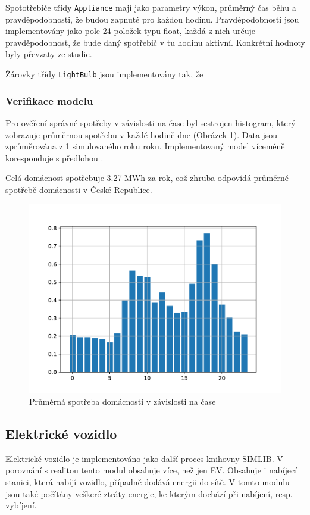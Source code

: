 \documentclass[12pt,a4paper]{article}
\begin{document}
Spototřebiče třídy \texttt{Appliance} mají jako parametry výkon, průměrný čas běhu a pravděpodobnosti, že budou zapnuté pro každou hodinu.
Pravděpodobnosti jsou implementovány jako pole 24 položek typu float,
každá z nich určuje pravděpodobnost, že bude daný spotřebič v tu hodinu aktivní.
Konkrétní hodnoty byly převzaty ze studie. \cite{TORRITI201737}

Žárovky třídy \texttt{LightBulb} jsou implementovány tak,
že

\subsubsection{Verifikace modelu}

Pro ověření správné spotřeby v závislosti na čase byl sestrojen histogram,
který zobrazuje průměrnou spotřebu v každé hodině dne (Obrázek \ref{fig:average_day_load}).
Data jsou zprůměrována z 1 simulovaného roku roku.
Implementovaný model víceméně koresponduje s předlohou \cite{TORRITI201737}.

Celá domácnost spotřebuje 3.27 MWh za rok, což zhruba odpovídá průměrné spotřebě domácnosti v České Republice\cite{CEZ}.



\begin{figure}
\includegraphics[width=\linewidth]{img/average_day_load.pdf}
\caption{Průměrná spotřeba domácnosti v závislosti na čase}
\label{fig:average_day_load}
\end{figure}

\subsection{Elektrické vozidlo}
Elektrické vozidlo je implementováno jako další proces knihovny SIMLIB.
V porovnání s realitou tento modul obsahuje více, než jen EV.
Obsahuje i nabíjecí stanici, která nabíjí vozidlo, případně dodává energii do sítě.
V tomto modulu jsou také počítány veškeré ztráty energie, ke kterým dochází při nabíjení, resp. vybíjení.
\end{document}
